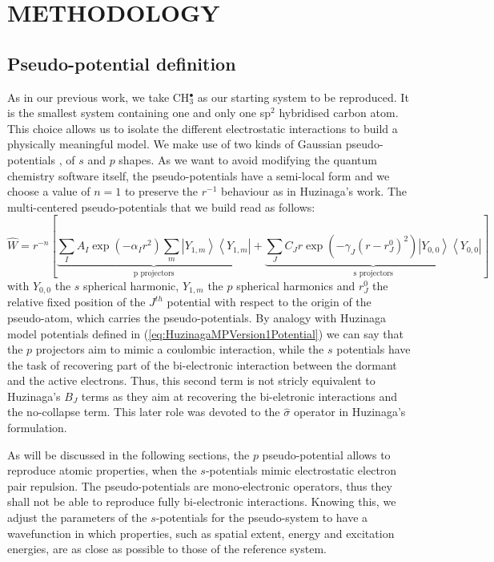 \documentclass[12pt]{article}
\begin{document}
\section*{\sffamily \Large METHODOLOGY}

\subsection*{\sffamily \large Pseudo-potential definition}

As in our previous work\cite{drujon_pseudopotentials_2013},
we take CH\(^{\bullet}_{3}\) as our starting system to be reproduced.
It is the smallest system containing one and only one sp$^2$ hybridised carbon atom.
This choice allows us to isolate the different electrostatic interactions
to build a physically meaningful model.
We make use of two kinds of Gaussian pseudo-potentials \cite{me_structure_theory}, of \(s\) and \(p\) shapes. As we want to avoid modifying the quantum chemistry software itself, the pseudo-potentials have a semi-local form and we choose a value of \(n = 1\) to preserve the \(r^{-1}\) behaviour as in Huzinaga's work.
The multi-centered pseudo-potentials that we build read as follows:
\begin{equation}
\label{eq:ourPP}
\hat{W} = r^{-n}\left[%
\underbrace{\sum_IA_I\exp(-\alpha_I r^2)\sum_m\left|Y_{1,m}\right>\left<Y_{1,m}\right|}_{\text{p projectors}}%
+%
\underbrace{\sum_JC_Jr\exp(-\gamma_J (r-r^0_J)^2)\left|Y_{0,0}\right>\left<Y_{0,0}\right|}_{\text{s projectors}}%
\right]
\end{equation}
with $Y_{0,0}$ the $s$ spherical harmonic, $Y_{1,m}$ the $p$ spherical harmonics and $r^0_J$ the relative fixed position of the $J^{th}$
potential with respect to the origin of the pseudo-atom, which carries the pseudo-potentials.
By analogy with Huzinaga model potentials defined in (\ref{eq:HuzinagaMPVersion1Potential})
we can say that the $p$ projectors aim to mimic a coulombic interaction,
while the $s$ potentials have the task of recovering part of the bi-electronic interaction
between the dormant and the active electrons.
Thus, this second term is not stricly equivalent to Huzinaga's $B_J$ terms as they aim at recovering
the bi-eletronic interactions and the no-collapse term.
This later role was devoted to the $\hat{\sigma}$ operator in Huzinaga's formulation.

As will be discussed in the following sections,
the \(p\) pseudo-potential allows to reproduce atomic properties, when the
\(s\)-potentials mimic electrostatic electron pair repulsion. The pseudo-potentials are mono-electronic operators, thus they shall not be able to reproduce fully bi-electronic interactions. Knowing this, we adjust the parameters of the \(s\)-potentials for the pseudo-system to have a wavefunction in which properties, such as spatial extent, energy and excitation energies, are as close as possible to those of the reference system.
\end{document}
